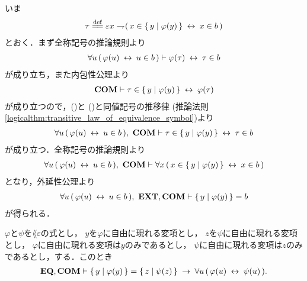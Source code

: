 	\begin{sketch}
		いま
		\begin{align}
			\tau \defeq 
			\varepsilon x \negation (\, x \in \Set{y}{\varphi(y)} \lrarrow x \in b\, )
		\end{align}
		とおく．まず全称記号の推論規則より
		\begin{align}
			\forall u\, (\, \varphi(u) \hspace{0.25em}\leftrightarrow\hspace{0.25em} u \in b\, )
			\vdash \varphi(\tau) \hspace{0.25em}\leftrightarrow\hspace{0.25em} \tau \in b
			\label{fom:equivalent_formula_rewriting_4_1}
		\end{align}
		が成り立ち，また内包性公理より
		\begin{align}
			\mbox{\bf COM} \vdash \tau \in \left\{\, y \mid \varphi(y)\, \right\} \hspace{0.25em}\leftrightarrow\hspace{0.25em} \varphi(\tau)
			\label{fom:equivalent_formula_rewriting_4_2}
		\end{align}
		が成り立つので，()と
		()と同値記号の推移律
		(推論法則\ref{logicalthm:transitive_law_of_equivalence_symbol})より
		\begin{align}
			\forall u\, (\, \varphi(u) \hspace{0.25em}\leftrightarrow\hspace{0.25em} u \in b\, ),\ \mbox{\bf COM} \vdash
			\tau \in \left\{\, y \mid \varphi(y)\, \right\} \hspace{0.25em}\leftrightarrow\hspace{0.25em} \tau \in b
		\end{align}
		が成り立つ．全称記号の推論規則より
		\begin{align}
			\forall u\, (\, \varphi(u) \hspace{0.25em}\leftrightarrow\hspace{0.25em} u \in b\, ),\ \mbox{\bf COM} \vdash
			\forall x\, (\, x \in \left\{\, y \mid \varphi(y)\, \right\} \hspace{0.25em}\leftrightarrow\hspace{0.25em} x \in b\, )
		\end{align}
		となり，外延性公理より
		\begin{align}
			\forall u\, (\, \varphi(u) \lrarrow u \in b\, ),\ \EXTAX,\COMAX \vdash
			\Set{y}{\varphi(y)} = b
		\end{align}
		が得られる．
		\QED
	\end{sketch}
	
	\begin{screen}
		\begin{thm}
		\label{thm:equivalent_formula_rewriting_5}
			$\varphi$と$\psi$を$\lang{\varepsilon}$の式とし，
			$y$を$\varphi$に自由に現れる変項とし，
			$z$を$\psi$に自由に現れる変項とし，
			$\varphi$に自由に現れる変項は$y$のみであるとし，
			$\psi$に自由に現れる変項は$z$のみであるとし，する．このとき
			\begin{align}
				\mbox{{\bf EQ}},\mbox{\bf COM} \vdash \left\{\, y \mid \varphi(y)\, \right\} = \left\{\, z \mid \psi(z)\, \right\}
				\hspace{0.25em}\rightarrow\hspace{0.25em} \forall u\, (\, \varphi(u) \hspace{0.25em}\leftrightarrow\hspace{0.25em} \psi(u)\, ).
			\end{align}
		\end{thm}
	\end{screen}
	
